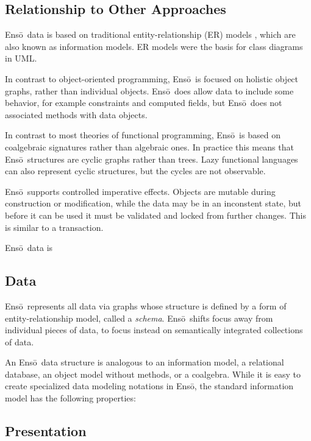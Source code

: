 \documentclass[11pt]{article}
\newcommand{\Enso}{Ens\={o}}
\begin{document}
\subsection{Relationship to Other Approaches}

\Enso\ data is based on traditional 
entity-relationship (ER) models \cite{FOO},
which are also known as information models. 
ER models were the basis for class diagrams in UML.

In contrast to
object-oriented programming, \Enso\ is focused on holistic
object graphs, rather than individual objects. \Enso\ 
does allow data to include some behavior, for example constraints
and computed fields, but \Enso\ does not associated methods
with data objects.

In contrast to
most theories of functional programming, \Enso\ is based on
coalgebraic signatures rather than algebraic ones. In practice
this means that \Enso\ structures are cyclic graphs rather than
trees. Lazy functional languages can also represent cyclic 
structures, but the cycles are not observable.

\Enso\ supports controlled imperative effects. Objects are
mutable during construction or modification, while the data may be in an
inconstent state, but before it can be used it must be validated
and locked from further changes. This is similar to a transaction.


\Enso\ data is 

\subsection{Data}

\Enso\ represents all data via graphs whose structure is defined
by a form of entity-relationship model, called a \textit{schema}. 
\Enso\ shifts focus away from individual pieces of data, to focus instead
on semantically integrated collections of data. 

An \Enso\ data structure is analogous to an information model,
a relational database, an object model without methods, or a coalgebra.
While it is easy to create specialized data modeling notations
in \Enso, the standard information model has the following properties:

\subsection{Presentation}
\end{document}
